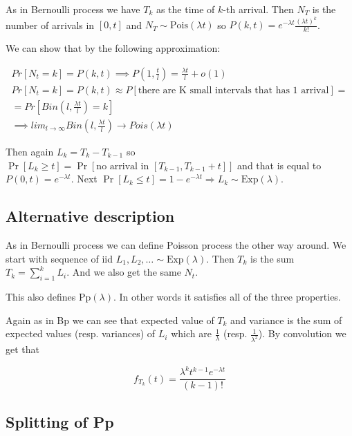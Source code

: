 
As in Bernoulli process we have $T_{k}$ as the time of $k$-th arrival. Then $N_{T}$ is the number of arrivals in $[0,t]$ and $N_{T} \sim \text{Pois}(\lambda t)$ so $P(k, t) = e^{-\lambda t} \frac{(\lambda t)^{k}}{k!}$.

We can show that by the following approximation:

$$
\begin{array}{c}
	Pr[N_t = k] = P(k,t) \implies P(1, \frac{t}{l}) = \frac{\lambda t}{l} + o(1) \\
	Pr[N_t = k] = P(k, t) \approx P[\text{there are K small intervals that has 1 arrival}] = \\
	= Pr[Bin(l, \frac{\lambda t}{l}) = k] \\ \implies lim_{l \to \infty} Bin(l, \frac{\lambda t}{l}) \to Pois(\lambda  t)
\end{array}
$$

Then again $L_{k} = T_{k} - T_{k-1}$ so $\Pr[L_{k} \geq t] = \Pr[\text{no arrival in }[T_{k-1}, T_{k-1}+t]]$ and that is equal to $P(0,t) = e^{-\lambda t}$. Next $\Pr[L_{k} \leq t] = 1 - e^{-\lambda t} \Rightarrow L_{k} \sim \text{Exp}(\lambda)$.

\subsection{Alternative description}

As in Bernoulli process we can define Poisson process the other way around. We start with sequence of iid $L_{1}, L_{2}, \dots \sim \text{Exp}(\lambda)$. Then $T_{k}$ is the sum $T_{k} = \sum_{i=1}^{k} L_{i}$. And we also get the same $N_{t}$.

\begin{thm}
	This also defines $\text{Pp}(\lambda)$. In other words it satisfies all of the three properties.
\end{thm}

Again as in Bp we can see that expected value of $T_{k}$ and variance is the sum of expected values (resp. variances) of $L_{i}$ which are $\frac{1}{\lambda}$ (resp. $\frac{1}{\lambda^{2}}$). By convolution we get that

$$
f_{T_{k}} (t) = \frac{\lambda^{k} t^{k-1}e^{-\lambda t}}{(k-1)!}
$$

\subsection{Splitting of Pp}


